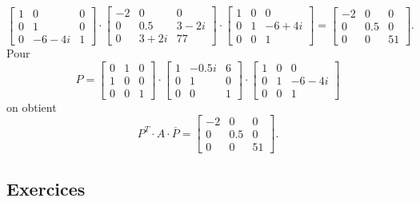 \begin{example}
\begin{displaymath}
  \left[\begin{matrix}1 & 0 & 0\\0 & 1 & 0\\0 & -6 - 4 i & 1\end{matrix}\right] \cdot 
\left[\begin{matrix}-2 & 0 & 0\\0 & 0.5 & 3 - 2 i\\0 & 3 + 2 i & 77\end{matrix}\right] \cdot 
\left[\begin{matrix}1 & 0 & 0\\0 & 1 & -6 + 4 i\\0 & 0 & 1\end{matrix}\right] = 
\left[\begin{matrix}-2 & 0 & 0\\0 & 0.5 & 0\\0 & 0 & 51\end{matrix}\right]. 
\end{displaymath}
Pour 
\begin{displaymath}
P =   \left[\begin{matrix}0 & 1 & 0\\1 & 0 & 0\\0 & 0 & 1\end{matrix}\right] \cdot 
\left[\begin{matrix}1 & - 0.5 i & 6\\0 & 1 & 0\\0 & 0 & 1\end{matrix}\right]
\cdot 
\left[\begin{matrix}1 & 0 & 0\\0 & 1 & -6 - 4 i\\0 & 0 & 1\end{matrix}\right]
\end{displaymath}
on obtient 
\begin{displaymath}
  P^T \cdot A \cdot \overline{P} = \left[\begin{matrix}-2 & 0 & 0\\0 & 0.5 & 0\\0 & 0 & 51\end{matrix}\right]. 
\end{displaymath}



\end{example}
 


\subsection*{Exercices}

